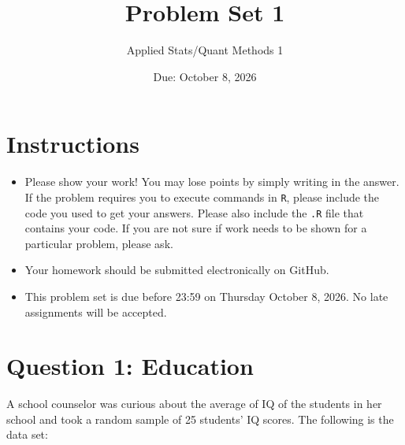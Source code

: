 \documentclass[12pt,letterpaper]{article}
\title{Problem Set 1}
\date{Due: October 8, 2026}
\author{Applied Stats/Quant Methods 1}
\begin{document}
	\maketitle
	
	\section*{Instructions}
	\begin{itemize}
	\item Please show your work! You may lose points by simply writing in the answer. If the problem requires you to execute commands in \texttt{R}, please include the code you used to get your answers. Please also include the \texttt{.R} file that contains your code. If you are not sure if work needs to be shown for a particular problem, please ask.
\item Your homework should be submitted electronically on GitHub.
\item This problem set is due before 23:59 on Thursday October 8, 2026. No late assignments will be accepted.
	\end{itemize}
	
	\vspace{1cm}
	\section*{Question 1: Education}

A school counselor was curious about the average of IQ of the students in her school and took a random sample of 25 students' IQ scores. The following is the data set:\\
\vspace{.5cm}

  


\vspace{1cm}
\end{document}
